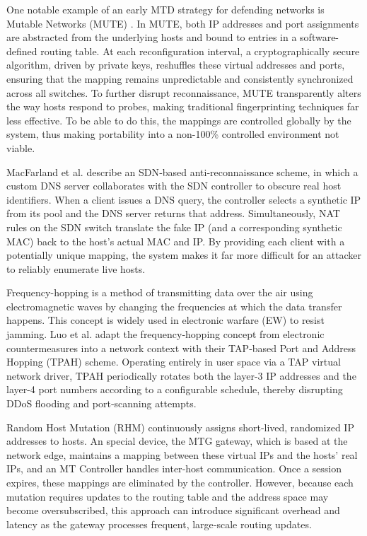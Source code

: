One notable example of an early MTD strategy for defending networks is Mutable Networks (MUTE) \cite{mtd_vol1}. In MUTE, both IP addresses and port assignments are abstracted from the underlying hosts and bound to entries in a software-defined routing table. At each reconfiguration interval, a cryptographically secure algorithm, driven by private keys, reshuffles these virtual addresses and ports, ensuring that the mapping remains unpredictable and consistently synchronized across all switches. To further disrupt reconnaissance, MUTE transparently alters the way hosts respond to probes, making traditional fingerprinting techniques far less effective. To be able to do this, the mappings are controlled globally by the system, thus making portability into a non-100\% controlled environment not viable.

MacFarland et al. \cite{macfarland2015} describe an SDN‐based anti‐reconnaissance scheme, in which a custom DNS server collaborates with the SDN controller to obscure real host identifiers. When a client issues a DNS query, the controller selects a synthetic IP from its pool and the DNS server returns that address. Simultaneously, NAT rules on the SDN switch translate the fake IP (and a corresponding synthetic MAC) back to the host’s actual MAC and IP. By providing each client with a potentially unique mapping, the system makes it far more difficult for an attacker to reliably enumerate live hosts.

Frequency-hopping\cite{kostic2001} is a method of transmitting data over the air using electromagnetic waves by changing the frequencies at which the data transfer happens. This concept is widely used in electronic warfare (EW) to resist jamming. Luo et al. \cite{luo2015} adapt the frequency‐hopping concept from electronic countermeasures into a network context with their TAP‐based Port and Address Hopping (TPAH) scheme. Operating entirely in user space via a TAP virtual network driver, TPAH periodically rotates both the layer-3 IP addresses and the layer-4 port numbers according to a configurable schedule, thereby disrupting DDoS flooding and port‐scanning attempts.

Random Host Mutation (RHM) \cite{al_shaer2013} continuously assigns short‐lived, randomized IP addresses to hosts. An special device, the MTG gateway, which is based at the network edge, maintains a mapping between these virtual IPs and the hosts’ real IPs, and an MT Controller handles inter‐host communication. Once a session expires, these mappings are eliminated by the controller. However, because each mutation requires updates to the routing table and the address space may become oversubscribed, this approach can introduce significant overhead and latency as the gateway processes frequent, large‐scale routing updates.

